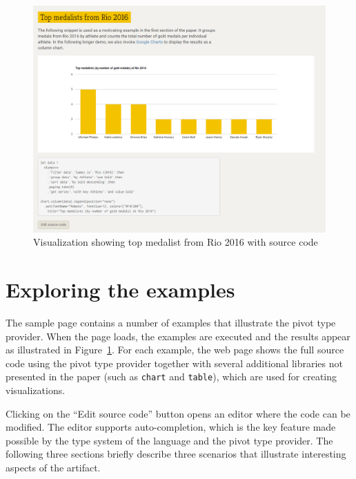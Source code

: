 \documentclass[a4paper,UKenglish]{lipics-v2016}
\theoremstyle{plain}
\theoremstyle{definition}
\begin{document}
\begin{figure}[t]
\begin{center}
\includegraphics[scale=0.35,trim=0mm 0mm 0mm 0mm,clip]{images/af-preview.png}
\end{center}
\caption{Visualization showing top medalist from Rio 2016 with source code}
\label{fig:chart}
\end{figure}

\section{Exploring the examples}

The sample page contains a number of examples that illustrate the pivot type provider. When the
page loads, the examples are executed and the results appear as illustrated in Figure~\ref{fig:chart}.
For each example, the web page shows the full source code using the pivot type provider together
with several additional libraries not presented in the paper (such as \texttt{chart} and \texttt{table}),
which are used for creating visualizations.

Clicking on the ``Edit source code'' button opens an editor where the code can be modified. The
editor supports auto-completion, which is the key feature made possible by the type system of the
language and the pivot type provider. The following three sections briefly describe three scenarios
that illustrate interesting aspects of the artifact.
\end{document}
